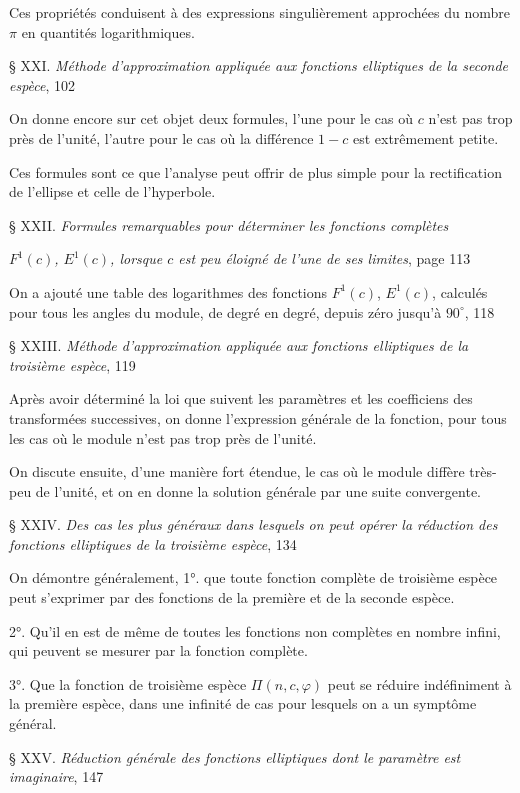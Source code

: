 \documentclass{article}
\begin{document}
Ces propriétés conduisent à des expressions singulièrement approchées du nombre $\pi$ en quantités logarithmiques.

§ XXI. \emph{Méthode d'approximation appliquée aux fonctions elliptiques de la seconde espèce}, 102

On donne encore sur cet objet deux formules, l'une pour le cas où $c$ n'est pas trop près de l'unité, l'autre pour le cas où la différence $1-c$ est extrêmement petite.

Ces formules sont ce que l'analyse peut offrir de plus simple pour la rectification de l'ellipse et celle de l'hyperbole.

§ XXII. \emph{Formules remarquables pour déterminer les fonctions complètes}

\emph{$F^{1}(c)$, $E^{1}(c)$, lorsque $c$ est peu éloigné de l'une de ses limites}, page 113

On a ajouté une table des logarithmes des fonctions $F^{1}(c)$, $E^{1}(c)$, calculés pour tous les angles du module, de degré en degré, depuis zéro jusqu'à $90^{\circ}$, 118

§ XXIII. \emph{Méthode d'approximation appliquée aux fonctions elliptiques de la troisième espèce}, 119

Après avoir déterminé la loi que suivent les paramètres et les coefficiens des transformées successives, on donne l'expression générale de la fonction, pour tous les cas où le module n'est pas trop près de l'unité.

On discute ensuite, d'une manière fort étendue, le cas où le module diffère très-peu de l'unité, et on en donne la solution générale par une suite convergente.

§ XXIV. \emph{Des cas les plus généraux dans lesquels on peut opérer la réduction des fonctions elliptiques de la troisième espèce}, 134

On démontre généralement, 1°. que toute fonction complète de troisième espèce peut s'exprimer par des fonctions de la première et de la seconde espèce.

2°. Qu'il en est de même de toutes les fonctions non complètes en nombre infini, qui peuvent se mesurer par la fonction complète.

3°. Que la fonction de troisième espèce $\Pi(n,c,\varphi)$ peut se réduire indéfiniment à la première espèce, dans une infinité de cas pour lesquels on a un symptôme général.

§ XXV. \emph{Réduction générale des fonctions elliptiques dont le paramètre est imaginaire}, 147
\end{document}
